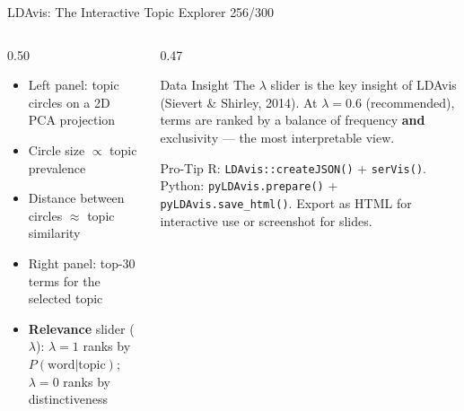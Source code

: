 \documentclass[10pt]{beamer}
\newcommand{\smark}[1]{\hfill{\scriptsize\color{codegray}#1}}
\begin{document}
\begin{frame}{LDAvis: The Interactive Topic Explorer}
\smark{256/300}
\begin{columns}[T]
\begin{column}{0.50\textwidth}
\begin{itemize}
    \item Left panel: topic circles on a 2D PCA projection
    \item Circle size $\propto$ topic prevalence
    \item Distance between circles $\approx$ topic similarity
    \item Right panel: top-30 terms for the selected topic
    \item \textbf{Relevance} slider ($\lambda$): $\lambda = 1$ ranks by $P(\text{word}|\text{topic})$; $\lambda = 0$ ranks by distinctiveness
\end{itemize}
\end{column}
\begin{column}{0.47\textwidth}
\begin{exampleblock}{Data Insight}
    \scriptsize The $\lambda$ slider is the key insight of LDAvis (Sievert \& Shirley, 2014). At $\lambda = 0.6$ (recommended), terms are ranked by a balance of frequency \textbf{and} exclusivity --- the most interpretable view.
\end{exampleblock}
\vspace{0.1cm}
\begin{alertblock}{Pro-Tip}
    \scriptsize R: \texttt{LDAvis::createJSON()} + \texttt{serVis()}. Python: \texttt{pyLDAvis.prepare()} + \texttt{pyLDAvis.save\_html()}. Export as HTML for interactive use or screenshot for slides.
\end{alertblock}
\end{column}
\end{columns}
\end{frame}
\end{document}
